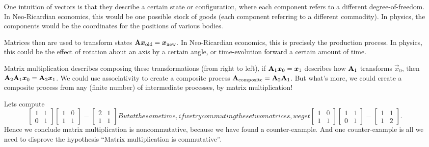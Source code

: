 \begin{remark}
One intuition of vectors is that they describe a certain state or
configuration, where each component refers to a different
degree-of-freedom. In Neo-Ricardian economics, this would be one
possible stock of goods (each component referring to a different commodity).
In physics, the components would be the coordinates for the positions of
various bodies.

Matrices then are used to transform states $\mathbf{A}\boldsymbol{x}_{\text{old}}=\boldsymbol{x}_{\text{new}}$. In Neo-Ricardian economics,
this is precisely the production process. In physics, this could be the
effect of rotation about an axis by a certain angle, or time-evolution
forward a certain amount of time.

Matrix multiplication describes composing these transformations (from
right to left), if $\mathbf{A}_{1}\boldsymbol{x}_{0}=\boldsymbol{x}_{1}$ describes how
$\mathbf{A}_{1}$ transforms $\vec{x}_{0}$, then
$\mathbf{A}_{2}\mathbf{A}_{1}\boldsymbol{x}_{0} = \mathbf{A}_{2}\boldsymbol{x}_{1}$. We could
use associativity to create a composite process
$\mathbf{A}_{\text{composite}}=\mathbf{A}_{2}\mathbf{A}_{1}$. But what's more, we
could create a composite process from any (finite number) of
intermediate processes, by matrix multiplication!
\end{remark}

\begin{example}
Lets compute
\begin{subequations}
\begin{equation}
\begin{bmatrix}1 & 1\\0 & 1 \end{bmatrix}
\begin{bmatrix}1 & 0\\1 & 1 \end{bmatrix}
=\begin{bmatrix}2 & 1\\1 & 1
\end{bmatrix}
\end{equation}
But at the same time, if we try commuting these two matrices, we get
\begin{equation}
\begin{bmatrix}1 & 0\\1 & 1 \end{bmatrix}
\begin{bmatrix}1 & 1\\0 & 1 \end{bmatrix}
=\begin{bmatrix}1 & 1\\1 & 2
\end{bmatrix}.
\end{equation}
\end{subequations}
Hence we conclude matrix multiplication is noncommutative, because we
have found a counter-example. And one counter-example is all we need to
disprove the hypothesis ``Matrix multiplication is commutative''.
\end{example}

